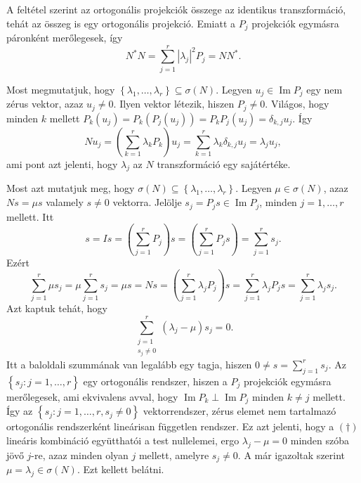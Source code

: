 \documentclass[9pt, a4paper, showtrims]{memoir}
\makeatletter
\renewenvironment{proof}[1][\proofname]
    {\par\pushQED{\qed}%
    \normalfont \topsep6\p@\@plus6\p@\relax
    \trivlist
    \item[\hskip\labelsep
        \itshape
    #1\@addpunct{:}]\ignorespaces}
    {\popQED\endtrivlist\@endpefalse}
\theoremstyle{plain}
\theoremstyle{remark}
\theoremstyle{definition}
\DeclareMathOperator{\im}{Im}
\makeatother
\begin{document}
\begin{proof}
    A feltétel szerint az ortogonális projekciók összege az identikus transzformáció, tehát
    az összeg is egy ortogonális projekció.
    Emiatt a $P_j$ projekciók egymásra páronként merőlegesek,
    így
    \[
        N^\ast N
        =
        \sum_{j=1}^r|\lambda_j|^2P_j
        =
        NN^\ast.
    \]

    Most megmutatjuk, hogy 
    $\left\{ \lambda_1,\dots,\lambda_r \right\}\subseteq \sigma(N)$.
    Legyen $u_j\in\im P_j$ egy nem zérus vektor, azaz $u_j\neq 0$.
    Ilyen vektor létezik, hiszen $P_{j}\neq 0$.
    Világos, hogy minden $k$ mellett
    \begin{math}
        P_k\left( u_j \right)
        =
        P_k\left( P_j\left( u_j \right) \right)
        =
        P_kP_j\left( u_j \right)
        =\delta_{k,j}u_j.
    \end{math}
   Így
   \[
       Nu_j
       =
       \left( \sum_{k=1}^r\lambda_kP_k \right)u_j
       =
       \sum_{k=1}^r\lambda_k\delta_{k,j}u_j
       =
       \lambda_ju_j,
   \]
   ami pont azt jelenti, hogy $\lambda_j$ az $N$ transzformáció egy sajátértéke.

   Most azt mutatjuk meg, hogy
   $\sigma(N)\subseteq \left\{ \lambda_1,\dots,\lambda_r \right\}$.
   Legyen $\mu\in\sigma(N)$, azaz $Ns=\mu s$ valamely $s\neq 0$ vektorra.
   Jelölje $s_j=P_js\in\im P_j$, minden $j=1,\dots,r$ mellett.
   Itt
   \[
   s=Is
   =
   \left( \sum_{j=1}^rP_j \right)s
   =
   \left( \sum_{j=1}^rP_js \right)
   =
   \sum_{j=1}^rs_j.
   \]
   Ezért
   \[
       \sum_{j=1}^r\mu s_j
       =
       \mu\sum_{j=1}^rs_j
       =
       \mu s
       =
       Ns
       =
       \left( \sum_{j=1}^r\lambda_jP_j \right)s
       =
       \sum_{j=1}^r\lambda_jP_js
       =
       \sum_{j=1}^r\lambda_js_j.
   \]
   Azt kaptuk tehát, hogy
   \[
       \sum_{\substack{j=1\\s_j\neq 0}}^r\left(\lambda_j-\mu \right)s_j=0.\tag{\dag}
   \]
   Itt a baloldali szummának van legalább egy tagja, hiszen 
   \(
   0 \neq s=\sum_{j=1}^rs_j.
   \)
   Az 
   $\left\{ s_j:j=1,\dots,r \right\}$ 
   egy ortogonális rendszer,
   hiszen a $P_j$ projekciók egymásra merőlegesek, ami ekvivalens avval, hogy
   $\im P_k\perp \im P_j$ minden $k\neq j$ mellett.
   Így az 
   $\left\{ s_j:j=1,\dots,r, s_j\neq 0 \right\}$ vektorrendszer, 
   zérus elemet nem tartalmazó ortogonális rendszerként lineárisan független rendszer.
   Ez azt jelenti, hogy a $(\dag)$ lineáris kombináció együtthatói a test nullelemei, ergo
   \begin{math}
       \lambda_j-\mu=0
   \end{math}
   minden szóba jövő $j$-re, 
   azaz minden olyan $j$ mellett, amelyre $s_j\neq 0$.
   A már igazoltak szerint
   \begin{math}
       \mu=\lambda_j\in\sigma(N).
   \end{math}
   Ezt kellett belátni. 
\end{proof}
\end{document}
